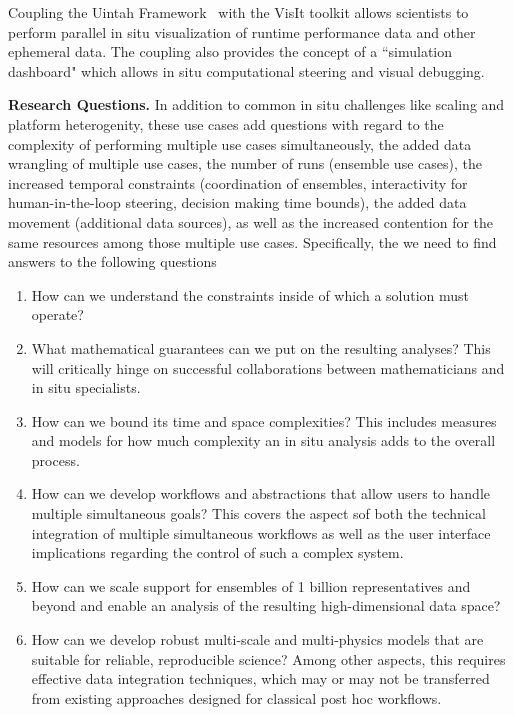 Coupling the Uintah Framework~\cite{MHB12} with the VisIt toolkit allows scientists to perform parallel in situ visualization of runtime performance data and other ephemeral data. The coupling also provides the concept of a “simulation dashboard" which allows in situ computational steering and visual debugging.

\medskip\noindent
\textbf{\sffamily Research Questions.} 
In addition to common in situ challenges like scaling and platform heterogenity, these use cases add questions with regard to the complexity of performing multiple use cases simultaneously, the added data wrangling of multiple use cases, the number of runs (ensemble use cases), the increased temporal constraints (coordination of ensembles, interactivity for human-in-the-loop steering, decision making time bounds), the added data movement (additional data sources), as well as the increased contention for the same resources among those multiple use cases.
Specifically, the we need to find answers to the following questions
\begin{enumerate}
    \item How can we understand the constraints inside of which a solution must operate? 
    \item What mathematical guarantees can we put on the resulting analyses?  This will critically hinge on successful collaborations between mathematicians and in situ specialists.
    \item How can we bound its time and space complexities? This includes measures and models for how much complexity an in situ analysis adds to the overall process.
    \item How can we develop workflows and abstractions that allow users to handle multiple simultaneous goals? This covers the aspect sof both the technical integration of multiple simultaneous workflows as well as the user interface implications regarding the control of such a complex system.
    \item How can we scale support for ensembles of 1 billion representatives and beyond and enable an analysis of the resulting high-dimensional data space?
    \item How can we develop robust multi-scale and multi-physics models that are suitable for reliable, reproducible science? Among other aspects, this requires effective data integration techniques, which may or may not be transferred from existing approaches designed for classical post hoc workflows.
\end{enumerate}


